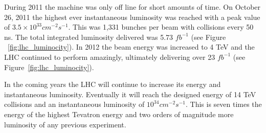 During 2011 the machine was only off line for short amounts of time.  On October 26, 2011 the highest ever instantaneous luminosity was reached with a peak value of $3.5 \times 10^{33} cm^{-2} s^{-1}$.  This was 1,331 bunches per beam with collisions every 50 ns. The total integrated luminosity delivered was 5.73 $fb^{-1}$ (see Figure ~\ref{fig:lhc_luminocity}). In 2012 the beam energy was increased to 4 TeV and the LHC continued to perform amazingly, ultimately delivering over 23 $fb^{-1}$ (see Figure~\ref{fig:lhc_luminocity}).

In the coming years the LHC will continue to increase its energy and instantaneous luminosity.  Eventually it will reach the designed energy of 14 TeV collisions and an instantaneous luminosity of $10^{34} cm^{-2}s^{-1}$.  This is seven times the energy of the highest Tevatron energy and two orders of magnitude more luminosity of any previous experiment.



